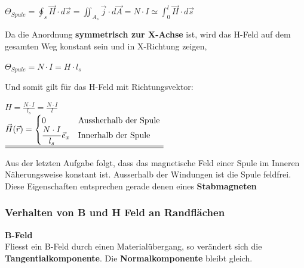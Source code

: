 \begin{center}

	$\displaystyle \Theta_{Spule} = \oint_{s} \vec{H} \cdot d\vec{s} = \iint_{A_s} \vec{j} \cdot d\vec{A} = N \cdot I \simeq \int_0^l \vec{H} \cdot d\vec{s}$
\end{center}

Da die Anordnung \textbf{symmetrisch zur X-Achse} ist, wird das H-Feld auf dem gesamten Weg konstant sein und in X-Richtung zeigen,
\begin{center}

	$ \displaystyle \Theta_{Spule} = N \cdot I = H \cdot l_{s}$

\end{center}
Und somit gilt für das H-Feld mit Richtungsvektor:
\begin{center}

	$\displaystyle H = \frac{N\cdot I}{l_{s}}  = \frac{N\cdot I}{l}$ \\ \fspace
	$\displaystyle
	\underline{\underline{   \vec{H}(\vec{r}) =
		\begin{cases}
			0                                              & $Aussherhalb der Spule $ \\
			\displaystyle \frac{N\cdot I}{l_{s}} \vec{e}_x & $Innerhalb der Spule $   \\
		\end{cases}}}$

\end{center}
\iend


Aus der letzten Aufgabe folgt, dass das magnetische Feld einer Spule im Inneren Näherungsweise konstant ist. Ausserhalb der Windungen ist die Spule feldfrei. \\
Diese Eigenschaften entsprechen gerade denen eines \textbf{Stabmagneten}


\subsubsection{Verhalten von B und H Feld an Randflächen}
\fix \fix
\textbf{B-Feld} \\
Fliesst ein B-Feld durch einen Materialübergang, so verändert sich die \textbf{Tangentialkomponente}. Die \textbf{Normalkomponente} bleibt gleich.
\begin{center}
\end{center}

